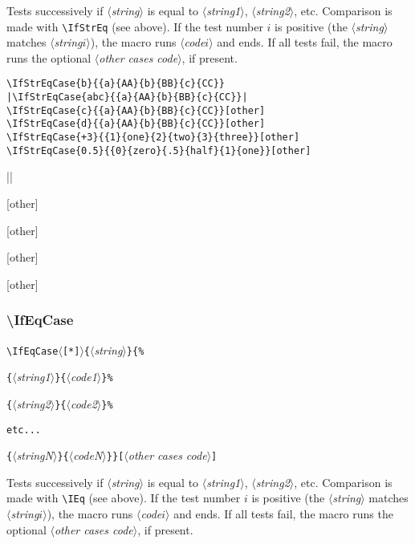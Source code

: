 \documentclass[a4paper,10pt]{article}
\newcommand\argu[1]{$\langle$\textit{#1}$\rangle$}
\newcommand\ARGU[1]{\texttt{\{}\argu{#1}\texttt{\}}}
\newcommand\arguC[1]{\texttt{[}\argu{#1}\texttt{]}}
\newcommand\etoile{$\langle$\texttt{[*]}$\rangle$}
\newcommand\styleexemple{\small\vskip4pt}
\newcommand\verbinline{\lstinline[basicstyle=\normalsize\ttfamily]}
\begin{document}
Tests successively if \argu{string} is equal to \argu{string1}, \argu{string2}, etc. Comparison is made with \verbinline|\IfStrEq| (see above). If the test number $i$ is positive (the \argu{string} matches \argu{string\;$i$}), the macro runs \argu{code\;$i$} and ends. If all tests fail, the macro runs the optional \argu{other cases code}, if present.\smallskip

\begin{minipage}[t]{0.65\linewidth}
\begin{lstlisting}
\IfStrEqCase{b}{{a}{AA}{b}{BB}{c}{CC}}
|\IfStrEqCase{abc}{{a}{AA}{b}{BB}{c}{CC}}|
\IfStrEqCase{c}{{a}{AA}{b}{BB}{c}{CC}}[other]
\IfStrEqCase{d}{{a}{AA}{b}{BB}{c}{CC}}[other]
\IfStrEqCase{+3}{{1}{one}{2}{two}{3}{three}}[other]
\IfStrEqCase{0.5}{{0}{zero}{.5}{half}{1}{one}}[other]
\end{lstlisting}%
\end{minipage}\hfill
\begin{minipage}[t]{0.35\linewidth}
	\styleexemple
	\par
	||\par
	[other]\par
	[other]\par
	[other]\par
	[other]
\end{minipage}%

\subsubsection{\ttfamily\textbackslash IfEqCase}

\begin{minipage}{\textwidth}
	\verbinline|\IfEqCase|\etoile\ARGU{string}\verb|{%|\par
	\qquad\qquad\ARGU{string1}\ARGU{code1}\verb|%|\par
	\qquad\qquad\ARGU{string2}\ARGU{code2}\verb|%|\par
	\qquad\qquad\verb|etc...|\par
	\qquad\qquad\ARGU{stringN}\ARGU{codeN}\verb|}|\arguC{other cases code}
\end{minipage}
\smallskip

Tests successively if \argu{string} is equal to \argu{string1}, \argu{string2}, etc. Comparison is made with \verbinline|\IEq| (see above). If the test number $i$ is positive (the \argu{string} matches \argu{string\;$i$}), the macro runs \argu{code\;$i$} and ends. If all tests fail, the macro runs the optional \argu{other cases code}, if present.\smallskip
\end{document}
